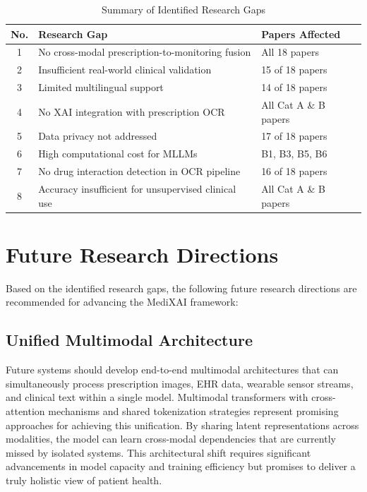 \documentclass[conference]{IEEEtran}
\begin{document}
\begin{table}[!htbp]
\centering
\caption{Summary of Identified Research Gaps}
\label{tab:gaps}
\footnotesize
\begin{tabular}{|c|p{3.5cm}|p{3.2cm}|}
\hline
\textbf{No.} & \textbf{Research Gap} & \textbf{Papers Affected} \\
\hline
1 & No cross-modal prescription-to-monitoring fusion & All 18 papers \\
\hline
2 & Insufficient real-world clinical validation & 15 of 18 papers \\
\hline
3 & Limited multilingual support & 14 of 18 papers \\
\hline
4 & No XAI integration with prescription OCR & All Cat A \& B papers \\
\hline
5 & Data privacy not addressed & 17 of 18 papers \\
\hline
6 & High computational cost for MLLMs & B1, B3, B5, B6 \\
\hline
7 & No drug interaction detection in OCR pipeline & 16 of 18 papers \\
\hline
8 & Accuracy insufficient for unsupervised clinical use & All Cat A \& B papers \\
\hline
\end{tabular}
\end{table}

\section{Future Research Directions}
\label{sec:future}

Based on the identified research gaps, the following future research directions are recommended for advancing the MediXAI framework:

\subsection{Unified Multimodal Architecture}

Future systems should develop end-to-end multimodal architectures that can simultaneously process prescription images, EHR data, wearable sensor streams, and clinical text within a single model. Multimodal transformers with cross-attention mechanisms and shared tokenization strategies represent promising approaches for achieving this unification. By sharing latent representations across modalities, the model can learn cross-modal dependencies that are currently missed by isolated systems. This architectural shift requires significant advancements in model capacity and training efficiency but promises to deliver a truly holistic view of patient health.
\end{document}
